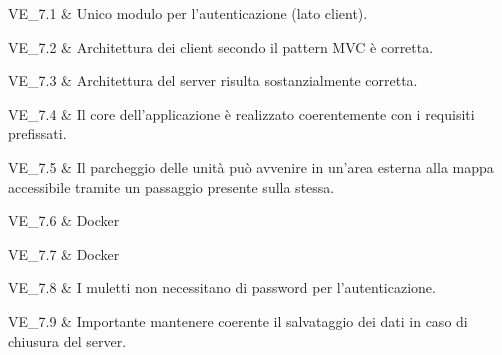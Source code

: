 VE\_7.1 & Unico modulo per l'autenticazione (lato client).

\tabularnewline
VE\_7.2 & Architettura dei client secondo il pattern MVC è corretta.

\tabularnewline
VE\_7.3 & Architettura del server risulta sostanzialmente corretta.

\tabularnewline
VE\_7.4 & Il core dell'applicazione è realizzato coerentemente con i requisiti prefissati.

\tabularnewline
VE\_7.5 & Il parcheggio delle unità può avvenire in un'area esterna alla mappa accessibile tramite un passaggio presente sulla stessa.

\tabularnewline
VE\_7.6 & Docker

\tabularnewline
VE\_7.7 & Docker

\tabularnewline
VE\_7.8 & I muletti non necessitano di password per l'autenticazione.

\tabularnewline
VE\_7.9 & Importante mantenere coerente il salvataggio dei dati in caso di chiusura del server.
